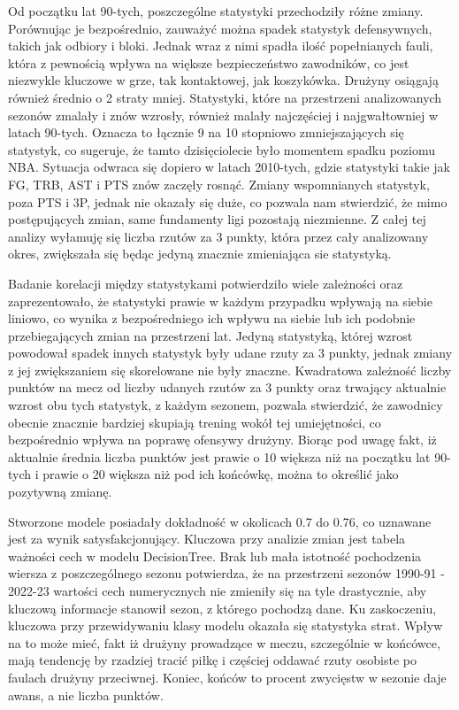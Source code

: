 \documentclass{article}
\begin{document}
Od początku lat 90-tych, poszczególne statystyki przechodziły różne zmiany. Porównując je bezpośrednio, zauważyć można spadek statystyk defensywnych, takich jak odbiory i bloki. Jednak wraz z nimi spadła ilość popełnianych fauli, która z pewnością wpływa na większe bezpieczeństwo zawodników, co jest niezwykle kluczowe w grze, tak kontaktowej, jak koszykówka. Drużyny osiągają również średnio o 2 straty mniej. Statystyki, które na przestrzeni analizowanych sezonów zmalały i znów wzrosły, również malały najczęściej i najgwałtowniej w latach 90-tych. Oznacza to łącznie 9 na 10 stopniowo zmniejszających się statystyk, co sugeruje, że tamto dzisięciolecie było momentem spadku poziomu NBA. Sytuacja odwraca się dopiero w latach 2010-tych, gdzie statystyki takie jak FG, TRB, AST i PTS znów zaczęły rosnąć. Zmiany wspomnianych statystyk, poza PTS i 3P, jednak nie okazały się duże, co pozwala nam stwierdzić, że mimo postępujących zmian, same fundamenty ligi pozostają niezmienne. Z całej tej analizy wyłamuję się liczba rzutów za 3 punkty, która przez cały analizowany okres, zwiększała się będąc jedyną znacznie zmieniająca sie statystyką.

Badanie korelacji między statystykami potwierdziło wiele zależności oraz zaprezentowało, że statystyki prawie w każdym przypadku wpływają na siebie liniowo, co wynika z bezpośredniego ich wpływu na siebie lub ich podobnie przebiegających zmian na przestrzeni lat. Jedyną statystyką, której wzrost powodował spadek innych statystyk były udane rzuty za 3 punkty, jednak zmiany z jej zwiększaniem się skorelowane nie były znaczne. Kwadratowa zależność liczby punktów na mecz od liczby udanych rzutów za 3 punkty oraz trwający aktualnie wzrost obu tych statystyk, z każdym sezonem, pozwala stwierdzić, że zawodnicy obecnie znacznie bardziej skupiają trening wokół tej umiejętności, co bezpośrednio wpływa na poprawę ofensywy drużyny. Biorąc pod uwagę fakt, iż aktualnie średnia liczba punktów jest prawie o 10 większa niż na początku lat 90-tych i prawie o 20 większa niż pod ich końcówkę, można to określić jako pozytywną zmianę.

Stworzone modele posiadały dokładność w okolicach 0.7 do 0.76, co uznawane jest za wynik satysfakcjonujący. Kluczowa przy analizie zmian jest tabela ważności cech w modelu DecisionTree. Brak lub mała istotność pochodzenia wiersza z poszczególnego sezonu potwierdza, że na przestrzeni sezonów 1990-91 - 2022-23 wartości cech numerycznych nie zmieniły się na tyle drastycznie, aby kluczową informacje stanowił sezon, z którego pochodzą dane. Ku zaskoczeniu, kluczowa przy przewidywaniu klasy modelu okazała się statystyka strat. Wpływ na to może mieć, fakt iż drużyny prowadzące w meczu, szczególnie w końcówce, mają tendencję by rzadziej tracić piłkę i częściej oddawać rzuty osobiste po faulach drużyny przeciwnej. Koniec, końców to procent zwycięstw w sezonie daje awans, a nie liczba punktów.
\end{document}
